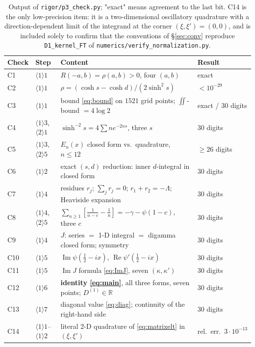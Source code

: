 \documentclass[11pt]{article}
\begin{document}
\begin{table}[h]\centering\footnotesize
\begin{tabular}{llll}\toprule
Check & Step & Content & Result\\\midrule
C1 & \(\langle1\rangle1\) & \(R(-a,b)=\rho(a,b)>0\), four \((a,b)\) & exact \\
C2 & \(\langle1\rangle1\) & \(\rho=(\cosh s-\cosh d)/(2\sinh^2s)\) & \(<10^{-29}\) \\
C3 & \(\langle1\rangle1\) & bound \eqref{eq:bound} on \(1521\) grid points; \(\iint\)-bound \(=4\log2\) & exact / \(30\) digits \\
C4 & \(\langle1\rangle3\), \(\langle2\rangle1\) & \(\sinh^{-2}s=4\sum n e^{-2ns}\), three \(s\) & \(30\) digits \\
C5 & \(\langle1\rangle3\), \(\langle2\rangle5\) & \(E_n(x)\) closed form vs.\ quadrature, \(n\le12\) & \(\ge26\) digits \\
C6 & \(\langle1\rangle2\) & exact \((s,d)\) reduction: inner \(d\)-integral in closed form & \(30\) digits \\
C7 & \(\langle1\rangle4\) & residues \(r_j\); \(\sum_jr_j=0\); \(r_1+r_2=-\Lambda\); Heaviside expansion & \(30\) digits \\
C8 & \(\langle1\rangle4\), \(\langle2\rangle5\) & \(\sum_{n\ge1}[\frac1{n-c}-\frac1n]=-\gamma-\psi(1-c)\), three \(c\) & \(30\) digits \\
C9 & \(\langle1\rangle4\) & \(J\): series \(=\) 1-D integral \(=\) digamma closed form; symmetry & \(30\) digits \\
C10 & \(\langle1\rangle5\) & \(\operatorname{Im}\psi(\frac12-ix)\), \(\operatorname{Re}\psi'(\frac12-ix)\) & \(30\) digits \\
C11 & \(\langle1\rangle5\) & \(\operatorname{Im}J\) formula \eqref{eq:ImJ}, seven \((\kappa,\kappa')\) & \(30\) digits \\
C12 & \(\langle1\rangle6\) & \textbf{identity \eqref{eq:main}}, all three forms, seven points; \(D^{(1)}\in\mathbb R\) & \(30\) digits \\
C13 & \(\langle1\rangle7\) & diagonal value \eqref{eq:diag}; continuity of the right-hand side & \(30\) digits \\
C14 & \(\langle1\rangle1\)--\(\langle1\rangle2\) & literal 2-D quadrature of \eqref{eq:matrixelt} in \((\xi,\xi')\) & rel.\ err.\ \(3\cdot10^{-13}\) \\
\bottomrule
\end{tabular}
\caption{Output of \texttt{rigor/p3\_check.py}; "exact" means agreement to the last bit.  C14 is the
only low-precision item: it is a two-dimensional oscillatory quadrature with a direction-dependent
limit of the integrand at the corner \((\xi,\xi')=(0,0)\), and is included solely to confirm that
the conventions of \S\ref{sec:conv} reproduce \texttt{D1\_kernel\_FT} of
\texttt{numerics/verify\_normalization.py}.}
\label{tab:numerics}
\end{table}
\end{document}
